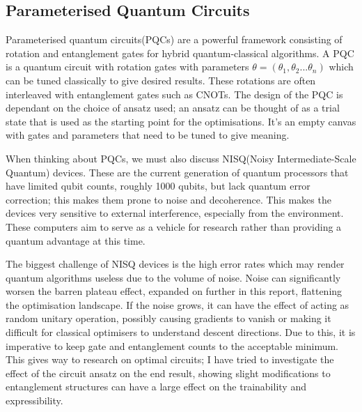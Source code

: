 \documentclass[12pt]{article}
\newcommand{\newp}
    {
    \vskip 0.5cm 
  }
\numberwithin{equation}{section}
\begin{document}
\subsection{Parameterised Quantum Circuits}
Parameterised quantum circuits(PQCs) are a powerful framework consisting of rotation 
and entanglement gates for hybrid quantum-classical algorithms. A PQC is a quantum 
circuit with rotation gates with parameters $\theta = (\theta_1, \theta_2...\theta_n)$
which can be tuned classically to give desired results. These rotations are often 
interleaved with entanglement gates such as CNOTs. The design of the PQC is 
dependant on the choice of ansatz used; an ansatz can be thought of as a trial 
state that is used as the starting point 
for the optimisations. It's an empty canvas with gates and parameters that need 
to be tuned to give meaning.
\newp 
When thinking about PQCs, we must also discuss NISQ(Noisy Intermediate-Scale 
Quantum) devices. These are the current generation of quantum processors that 
have limited qubit counts, roughly 1000 qubits, but lack quantum error correction; 
this makes them prone to noise and decoherence. This makes the devices very sensitive 
to external interference, especially from the environment. These computers aim 
to serve as a vehicle for research rather than providing a quantum advantage 
at this time.
\newp
The biggest challenge of NISQ devices is the high error rates which may render 
quantum algorithms useless due to the volume of noise. Noise can significantly 
worsen the barren plateau effect, expanded on further in this report, flattening 
the optimisation landscape. If the noise grows, it can have the effect of acting 
as random unitary operation, possibly causing gradients to vanish or making it 
difficult for classical optimisers to understand descent directions. 
Due to this, it is imperative to keep gate and entanglement counts to the acceptable 
minimum. This gives way to research on optimal circuits; I have tried to investigate 
the effect of the circuit ansatz on the end result, showing slight modifications 
to entanglement structures can have a large effect on the trainability and 
expressibility. 
\end{document}
